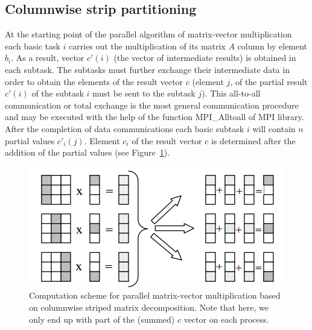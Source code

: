 \subsection{Columnwise strip partitioning} %
\label{sub:matrix_vector_multiplication_in_case_of_columnwise_data_decomposition}
At the starting point of the parallel algorithm of matrix-vector multiplication each basic task $i$ carries out the multiplication of its matrix $A$ column by element $b_i$. As a result, vector $c'(i)$ (the vector of intermediate results) is obtained in each subtask. The subtasks must further exchange their intermediate data in order to obtain the elements of the result vector $c$ (element $j$, of the partial result $c'(i)$ of the subtask $i$ must be sent to the subtask $j$). This all-to-all communication or total exchange is the most general communication procedure and may be executed with the help of the function MPI\_Alltoall of MPI library. After the completion of data communications each basic subtask $i$ will contain $n$ partial values $c'_i(j)$. Element $c_i$ of the result vector $c$ is determined after the addition of the partial values (see Figure~\ref{fig:colwise}).

\begin{figure}[htbp]
  \centering
  \includegraphics[width=.5\textwidth]{illustrations/matrix-vector-product/column.png}
  \caption{Computation scheme for parallel matrix-vector multiplication based on columnwise striped matrix decomposition. Note that here, we only end up with part of the (summed) $c$ vector on each process.}
  \label{fig:colwise}
\end{figure}



